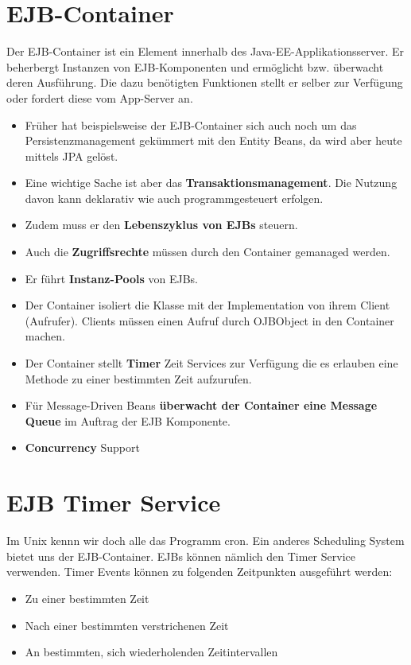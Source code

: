 \section{EJB-Container}
Der EJB-Container ist ein Element innerhalb des Java-EE-Applikationsserver. Er beherbergt Instanzen von EJB-Komponenten und ermöglicht bzw. überwacht deren Ausführung. Die dazu benötigten Funktionen stellt er selber zur Verfügung oder fordert diese vom App-Server an.

\begin{itemize}
	\item Früher hat beispielsweise der EJB-Container sich auch noch um das Persistenzmanagement gekümmert mit den Entity Beans, da wird aber heute mittels JPA gelöst.
	\item Eine wichtige Sache ist aber das \textbf{Transaktionsmanagement}.  Die Nutzung davon kann deklarativ wie auch programmgesteuert erfolgen.
	\item Zudem muss er den \textbf{Lebenszyklus von EJBs} steuern.
	\item Auch die \textbf{Zugriffsrechte} müssen durch den Container gemanaged werden.
	\item Er führt \textbf{Instanz-Pools} von EJBs.
	\item Der Container isoliert die Klasse mit der Implementation von ihrem Client (Aufrufer). Clients müssen einen Aufruf durch OJBObject in den Container machen.
	\item Der Container stellt \textbf{Timer} Zeit Services zur Verfügung die es erlauben eine Methode zu einer bestimmten Zeit aufzurufen.
	\item Für Message-Driven Beans\textbf{ überwacht der Container eine Message Queue }im  Auftrag der EJB Komponente. 
	\item \textbf{Concurrency} Support 
\end{itemize}

\section{EJB Timer Service}
Im Unix kennn wir doch alle das Programm cron. Ein anderes Scheduling System bietet uns der EJB-Container. EJBs können nämlich den Timer Service verwenden. Timer Events können zu folgenden Zeitpunkten ausgeführt werden:
\begin{itemize}
\item Zu einer bestimmten Zeit 
\item Nach einer bestimmten verstrichenen Zeit 
\item An bestimmten, sich wiederholenden Zeitintervallen 
\end{itemize}	

